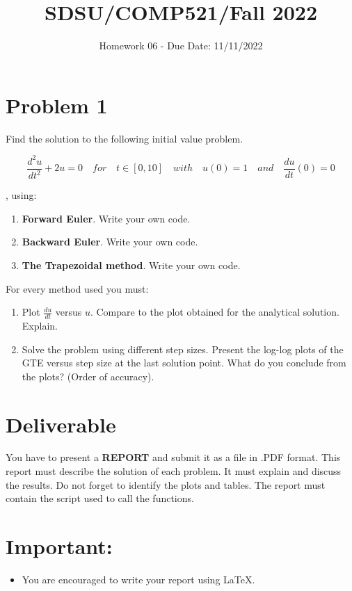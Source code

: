 \documentclass{article}
\title{SDSU/COMP521/Fall 2022}
\author{Homework 06 - Due Date: 11/11/2022}
\begin{document}
\newcommand{\norm}[1]{\left\lVert#1\right\rVert}
\maketitle

\section*{Problem 1}
Find the solution to the following initial value problem.

\begin{equation}
\frac{d^2u}{dt^2}+2u= 0 \quad  for \quad t \in [0,10]
\quad with \quad u(0) = 1 \quad and \quad \frac{du}{dt}(0) = 0
\label{eq01}
\end{equation}

, using:

\begin{enumerate}
	\item \textbf{Forward Euler}. Write your own code.\\
	\item \textbf{Backward Euler}. Write your own code.\\
	\item \textbf{The Trapezoidal method}. Write your own code.\\
\end{enumerate}

For every method used you must:

\begin{enumerate}
	\item Plot $\frac{du}{dt}$ versus $u$. Compare to the plot obtained for the analytical solution. Explain.
	\item Solve the problem using different step sizes. Present the log-log plots of the GTE versus step size at the last solution point. What do you conclude from the plots? (Order of accuracy).
\end{enumerate}


\section*{Deliverable}
You have to present a \textbf{REPORT} and submit it as a file in .PDF format. This report must describe the solution of each problem. It must explain and discuss the results. Do not forget to identify the plots and tables. The report must contain the script used to call the functions.\\

\section*{Important:}
\begin{itemize}
	\item You are encouraged to write your report using \LaTeX. 
\end{itemize}
 
\end{document}
